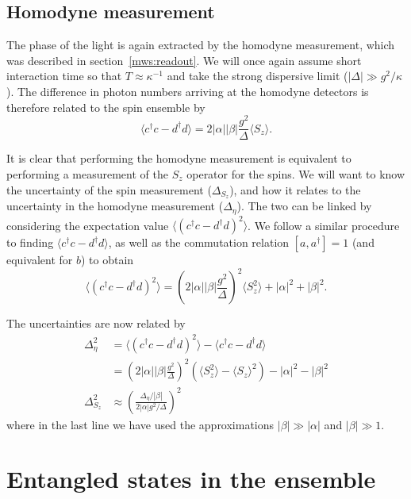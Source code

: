 \subsection{Homodyne measurement}

The phase of the light is again extracted by the homodyne measurement, which
was described in section~\ref{mws:readout}. We will once again assume short
interaction time so that $T\approx\kappa^{-1}$ and take the strong dispersive
limit ($|\Delta| \gg g^2/\kappa$). The difference in photon numbers arriving at
the homodyne detectors is therefore related to the spin ensemble by
%
\begin{equation}
  \langle c^\dagger c - d^\dagger d\rangle = 2|\alpha||\beta|
  \frac{g^2}{\Delta}\langle S_z\rangle.
  \label{eqn:homomeas}
\end{equation}

It is clear that performing the homodyne measurement is equivalent to
performing a measurement of the $S_z$ operator for the spins. We will want to
know the uncertainty of the spin measurement ($\Delta_{S_z}$), and how it
relates to the uncertainty in the homodyne measurement ($\Delta_\eta$). The two
can be linked by considering the expectation value $\langle (c^\dagger c -
d^\dagger d)^2 \rangle$.
We follow a similar procedure to finding $\langle c^\dagger c - d^\dagger d
\rangle$, as well as the commutation relation $[a,a^\dagger] = 1$ (and
equivalent for $b$) to obtain
%
\begin{equation}
  \langle (c^\dagger c - d^\dagger d)^2 \rangle = (2|\alpha||\beta|
  \frac{g^2}{\Delta})^2\langle S_z^2\rangle + |\alpha|^2+|\beta|^2.
\end{equation}

The uncertainties are now related by
%
\begin{align}
  \Delta_\eta^2 &= \langle (c^\dagger c - d^\dagger d)^2 \rangle - \langle
  c^\dagger c - d^\dagger d\rangle \\
  &= (2|\alpha||\beta| \frac{g^2}{\Delta})^2(\langle S_z^2\rangle - \langle
  S_z\rangle^2) - |\alpha|^2 - |\beta|^2 \\
  \Delta_{S_z}^2 &\approx
  \left(\frac{\Delta_\eta/|\beta|}{2|\alpha|g^2/\Delta}\right)^2
  \label{squeeze:eqn:homouncert}
\end{align}
%
where in the last line we have used the approximations $|\beta| \gg |\alpha|$
and $|\beta|\gg 1$.

\section{Entangled states in the ensemble}

